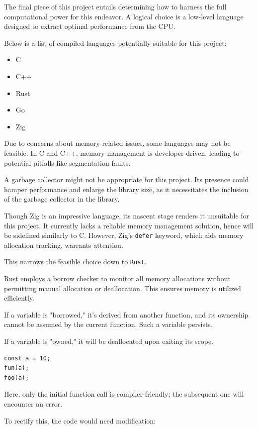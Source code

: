 \documentclass[10pt,journal,compsoc]{IEEEtran}
\begin{document}
The final piece of this project entails determining how to harness the full computational power for this endeavor. A logical choice is a low-level language designed to extract optimal performance from the CPU.

Below is a list of compiled languages potentially suitable for this project:

\begin{itemize}
    \item C
    \item C++
    \item Rust
    \item Go
    \item Zig
\end{itemize}

Due to concerns about memory-related issues, some languages may not be feasible. In C and C++, memory management is developer-driven, leading to potential pitfalls like segmentation faults. \cite{9793767}

A garbage collector might not be appropriate for this project. Its presence could hamper performance and enlarge the library size, as it necessitates the inclusion of the garbage collector in the library.

Though Zig is an impressive language, its nascent stage renders it unsuitable for this project. It currently lacks a reliable memory management solution, hence will be sidelined similarly to C. However, Zig's \verb|defer| keyword, which aids memory allocation tracking, warrants attention.

This narrows the feasible choice down to \verb|Rust|.

Rust employs a borrow checker to monitor all memory allocations without permitting manual allocation or deallocation. This ensures memory is utilized efficiently.

If a variable is "borrowed," it's derived from another function, and its ownership cannot be assumed by the current function. Such a variable persists.

If a variable is "owned," it will be deallocated upon exiting its scope.

\begin{lstlisting}
const a = 10;
fun(a);
foo(a);
\end{lstlisting}

Here, only the initial function call is compiler-friendly; the subsequent one will encounter an error.

To rectify this, the code would need modification:
\end{document}
